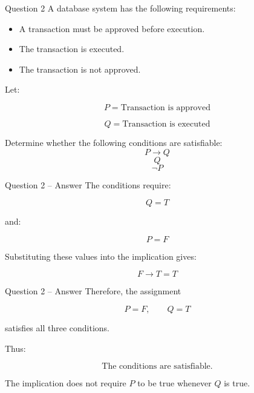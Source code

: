 
\begin{frame}{Question 2}
A database system has the following requirements:

\begin{itemize}
\item A transaction must be approved before execution.
\item The transaction is executed.
\item The transaction is not approved.
\end{itemize}

Let:

$$
P = \text{Transaction is approved}
$$

$$
Q = \text{Transaction is executed}
$$

Determine whether the following conditions are satisfiable:
$$
P\rightarrow Q
$$
$$
Q
$$
$$
\neg P
$$

\end{frame}

\begin{frame}{Question 2 -- Answer}
The conditions require:

$$
Q=T
$$

and:

$$
P=F
$$

Substituting these values into the implication gives:

$$
F\rightarrow T = T
$$

\end{frame}

\begin{frame}{Question 2 -- Answer}
Therefore, the assignment

$$
P=F,\qquad Q=T
$$

satisfies all three conditions.

Thus:

$$
\boxed{\text{The conditions are satisfiable.}}
$$

The implication does not require $P$ to be true whenever $Q$ is true.
\end{frame}


